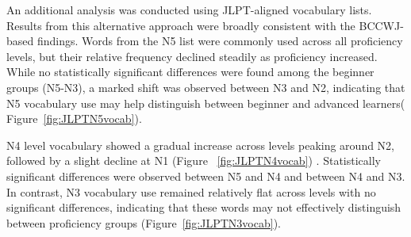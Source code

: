 
An additional analysis was conducted using JLPT-aligned vocabulary lists. Results from this alternative
approach were broadly consistent with the BCCWJ-based findings. Words from the
N5 list were commonly used across all proficiency levels, but their relative frequency declined steadily as
proficiency increased.
While no statistically significant differences were found among the beginner groups (N5-N3), a marked shift
was observed between
N3 and N2, indicating that N5 vocabulary use may help distinguish between beginner and advanced learners(
Figure~\ref{fig:JLPTN5vocab}).

N4 level vocabulary showed a gradual increase across levels peaking around N2, followed by a slight decline 
at N1 (Figure~
\ref{fig:JLPTN4vocab})
. Statistically significant
differences were observed between N5 and N4 and
between N4 and N3. In contrast, N3 vocabulary use remained relatively flat across levels with no 
significant 
differences,
indicating that these words may not effectively distinguish between proficiency groups (Figure~\ref{fig:JLPTN3vocab}).

